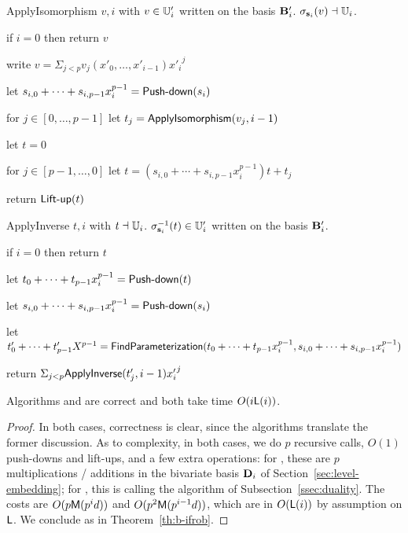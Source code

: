 \begin{algorithm}
  {ApplyIsomorphism} 
  {$v,i$ with $v\in \mathbb{U}'_i$ written on the basis $\mathbf{B}'_i$.}
  {$\sigma_{\mathbf{s}_i}(v) \dashv \mathbb{U}_i$.}
\item if $i=0$ then return $v$
\item write $v=\Sigma_{j <p} v_j(x'_0,\dots,x'_{i-1}) {x'_i}^j$
\item let $s_{i,0}+\cdots+s_{i,p-1}x_i^{p-1}=\text{{\sf Push-down}}(s_i)$
\item for $j \in [0,\dots,p-1]$ let $t_j={\sf ApplyIsomorphism}(v_j,i-1)$
\item let $t=0$
\item  for $j \in [p-1,\dots,0]$ let $t=(s_{i,0}+\cdots+s_{i,p-1}x_i^{p-1})t+t_j$
\item return $\text{{\sf Lift-up}}(t)$
\end{algorithm}
\begin{algorithm}
  {ApplyInverse} 
  {$t,i$ with $t \dashv \mathbb{U}_i$.}
  {$\sigma_{\mathbf{s}_i}^{-1}(t)\in \mathbb{U}'_i$ written on the basis $\mathbf{B}'_i$.}
\item if $i=0$ then return $t$
\item let $t_0 + \cdots + t_{p-1}x_i^{p-1} = \text{{\sf Push-down}}(t)$
\item let $s_{i,0}+\cdots+s_{i,p-1}x_i^{p-1}=\text{{\sf Push-down}}(s_i)$
\item let $t'_0 + \cdots + t'_{p-1}X^{p-1} = {\sf FindParameterization}
  (t_0 + \cdots + t_{p-1}x_i^{p-1}, s_{i,0}+\cdots+s_{i,p-1}x_i^{p-1})$
\item return $\Sigma_{j < p} {\sf ApplyInverse}(t'_j, i-1) {x'_i}^j$
\end{algorithm}


\begin{proposition}\label{Prop:apply}
  Algorithms  and   are
correct and both take time $O(i\mathsf{L}(i))$.
\end{proposition}
\begin{proof} In both cases, correctness is clear, since the algorithms
translate the former discussion. As to complexity, in both cases, we
do $p$ recursive calls, $O(1)$ push-downs and lift-ups, and a few
extra operations: for , these are $p$
multiplications / additions in the bivariate basis ${\bf D}_i$ of
Section~\ref{sec:level-embedding}; for , this is
calling the algorithm  of
Subsection~\ref{ssec:duality}.  The costs are $O(p\mathrm{\sf M}(p^id))$ and
$O(p^2\mathrm{\sf M}(p^{i-1}d))$, which are in $O(\mathsf{L}(i))$ by assumption on
$\mathsf{L}$. We conclude as in Theorem~\ref{th:b-ifrob}.\end{proof}

